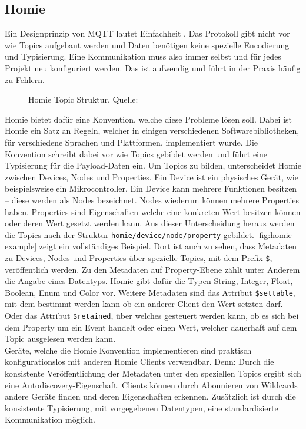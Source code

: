 \subsection{Homie}
\label{subs:homie}

Ein Designprinzip von MQTT lautet Einfachheit \cite{mqtt-design-principles}. 
Das Protokoll gibt nicht vor wie Topics aufgebaut werden und Daten benötigen keine spezielle
Encodierung und Typisierung. Eine Kommunikation muss also immer selbst und
für jedes Projekt neu konfiguriert werden. Das ist aufwendig und führt in der 
Praxis häufig zu Fehlern.\\

\begin{figure}
  
  \caption{Homie Topic Struktur. Quelle: \cite{homie}}
  \label{fig:homie-example}
\end{figure}

Homie \cite{homie} bietet dafür eine Konvention, welche diese Probleme lösen soll. Dabei ist Homie
ein Satz an Regeln, welcher in einigen verschiedenen Softwarebibliotheken, für verschiedene
Sprachen und Plattformen, implementiert wurde. Die Konvention schreibt dabei vor wie Topics 
gebildet werden und führt eine Typisierung für die Payload-Daten ein.
Um Topics zu bilden, unterscheidet Homie zwischen Devices, Nodes und Properties. Ein Device
ist ein physisches Gerät, wie beispielsweise ein Mikrocontroller.
Ein Device kann mehrere Funktionen besitzen -- diese werden als Nodes
bezeichnet. Nodes wiederum können mehrere Properties haben. Properties sind Eigenschaften welche 
eine konkreten Wert besitzen können oder deren Wert gesetzt werden kann. Aus dieser Unterscheidung
heraus werden die Topics nach der Struktur \texttt{homie/device/node/property} gebildet. 
\autoref{fig:homie-example} zeigt ein vollständiges Beispiel. Dort ist auch zu sehen, dass 
Metadaten zu Devices, Nodes und Properties über spezielle Topics, mit dem Prefix \texttt{\$},
veröffentlich werden. Zu den Metadaten auf Property-Ebene zählt unter Anderem die Angabe eines
Datentyps. Homie gibt dafür die Typen String, Integer, Float, Boolean, Enum und Color vor.
Weitere Metadaten sind das Attribut \texttt{\$settable}, mit dem bestimmt werden kann
ob ein anderer Client den Wert setzten darf. Oder das Attribut \texttt{\$retained}, über 
welches gesteuert werden kann, ob es sich bei dem Property um ein Event handelt oder einen Wert,
welcher dauerhaft auf dem Topic ausgelesen werden kann.\\
Geräte, welche die Homie Konvention implementieren sind praktisch konfigurationslos mit anderen
Homie Clients verwendbar. Denn: Durch die konsistente Veröffentlichung der Metadaten unter 
den speziellen Topics ergibt sich eine Autodiscovery-Eigenschaft. Clients können durch Abonnieren
von Wildcards andere Geräte finden und deren Eigenschaften erkennen. Zusätzlich ist durch die
konsistente Typisierung, mit vorgegebenen Datentypen, eine standardisierte Kommunikation möglich. 

